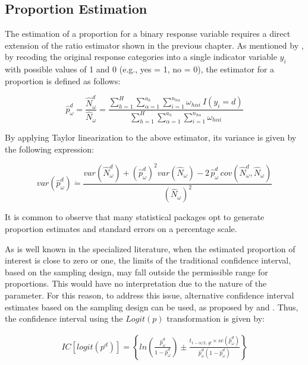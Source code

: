 \documentclass[
  12pt,
]{book}
\begin{document}
\hypertarget{proportion-estimation}{%
\subsection{Proportion Estimation}\label{proportion-estimation}}

The estimation of a proportion for a binary response variable requires a direct extension of the ratio estimator shown in the previous chapter. As mentioned by \citet{Heeringa_West_Berglund_2017}, by recoding the original response categories into a single indicator variable \(y_{i}\) with possible values of 1 and 0 (e.g., yes = 1, no = 0), the estimator for a proportion is defined as follows:

\[
\hat{p}_{\omega}^d = \frac{\hat{N}^d_{\omega}}{\hat{N}_{\omega}} 
= \frac{\sum_{h=1}^{H}\sum_{\alpha=1}^{a_{h}}\sum_{i=1}^{n_{h\alpha}}\omega_{h\alpha i}\ I(y_i = d)}{\sum_{h=1}^{H}\sum_{\alpha=1}^{a_{h}}\sum_{i=1}^{n_{h\alpha}}\omega_{h\alpha i}}
\]

By applying Taylor linearization to the above estimator, its variance is given by the following expression:

\[
var\left(\hat{p}_{\omega}^d\right) \dot{=} \frac{var\left(\hat{N}^{d}_{\omega}\right)+(\hat{p}_{\omega}^d)^{2}var\left(\hat{N}_{\omega}\right)-2\,\hat{p}_{\omega}^d\,cov\left(\hat{N}^{d}_{\omega},\hat{N}_{\omega}\right)}{(\hat{N}_{\omega})^{2}}
\]

It is common to observe that many statistical packages opt to generate proportion estimates and standard errors on a percentage scale.

As is well known in the specialized literature, when the estimated proportion of interest is close to zero or one, the limits of the traditional confidence interval, based on the sampling design, may fall outside the permissible range for proportions. This would have no interpretation due to the nature of the parameter. For this reason, to address this issue, alternative confidence interval estimates based on the sampling design can be used, as proposed by \citet{Rust2007ConfidenceIF} and \citet{DeanPagano2015}. Thus, the confidence interval using the \(Logit\left(p\right)\) transformation is given by:

\begin{eqnarray}
IC\left[logit\left(p^d\right)\right]  =  \left\{ ln\left(\frac{\hat{p}_{\omega}^d}{1-\hat{p}_{\omega}^d}\right)\pm\frac{t_{1-\alpha/2,\,gl} \times   se\left(\hat{p}_{\omega}^d\right)}{\hat{p}_{\omega}^d\left(1-\hat{p}_{\omega}^d\right)}\right\} 
\end{eqnarray}
\end{document}
